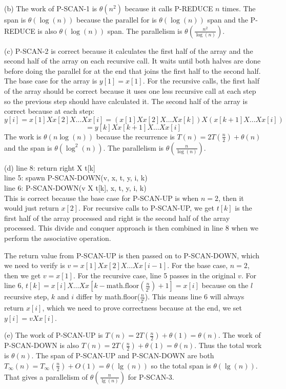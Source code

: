 \documentclass{article}
\begin{document}
(b) The work of P-SCAN-1 is $\theta(n^2)$ because it calls P-REDUCE $n$ times. The span is $\theta(\log(n))$ because the parallel for is $\theta(\log(n))$ span and the P-REDUCE is also $\theta(\log(n))$ span. The parallelism is $\theta(\frac{n^2}{\log(n)})$.

(c) P-SCAN-2 is correct because it calculates the first half of the array and the second half of the array on each recursive call. It waits until both halves are done before doing the parallel for at the end that joins the first half to the second half. The base case for the array is $y[1] = x[1]$. For the recursive calls, the first half of the array should be correct because it uses one less recursive call at each step so the previous step should have calculated it. The second half of the array is correct because at each step:
$$y[i] = x[1] X x[2] X \dotsc X x[i] = (x[1] X x[2] X \dotsc X x[k]) X (x[k + 1] X \dotsc X x[i])$$
$$= y[k] X x[k + 1] X \dotsc X x[i]$$
The work is $\theta(n\log(n))$ because the recurrence is $T(n) = 2T(\frac{n}{2}) + \theta(n)$ and the span is $\theta(\log^2(n))$. The parallelism is $\theta(\frac{n}{\log(n)})$.

(d) line 8: return right X t[k]\\
line 5: spawn P-SCAN-DOWN(v, x, t, y, i, k)\\
line 6: P-SCAN-DOWN(v X t[k], x, t, y, i, k)\\
This is correct because the base case for P-SCAN-UP is when $n=2$, then it would just return $x[2]$. For recursive calls to P-SCAN-UP, we get $t[k]$ is the first half of the array processed and right is the second half of the array processed. This divide and conquer approach is then combined in line 8 when we perform the associative operation.

The return value from P-SCAN-UP is then passed on to P-SCAN-DOWN, which we need to verify is $v = x[1] X x[2] X \dotsc X x[i - 1]$. For the base case, $n=2$, then we get $v = x[1]$. For the recursive case, line 5 passes in the original $v$. For line 6, $t[k] = x[i] X \dotsc X x[k - \text{math.floor}(\frac{n}{2^l}) + 1] = x[i]$ because on the $l$ recursive step, $k$ and $i$ differ by math.floor($\frac{n}{2^l}$). This means line 6 will always return $x[i]$, which we need to prove correctness because at the end, we set $y[i] = v X x[i]$.

(e) The work of P-SCAN-UP is $T(n) = 2T(\frac{n}{2}) + \theta(1) = \theta(n)$. The work of P-SCAN-DOWN is also $T(n) = 2T(\frac{n}{2}) + \theta(1) = \theta(n)$. Thus the total work is $\theta(n)$. The span of P-SCAN-UP and P-SCAN-DOWN are both $T_{\infty}(n) = T_{\infty}(\frac{n}{2}) + O(1) = \theta(\lg(n))$ so the total span is $\theta(\lg(n))$. That gives a parallelism of $\theta(\frac{n}{\lg(n)})$ for P-SCAN-3.
\end{document}

